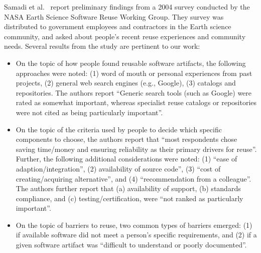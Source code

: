 \documentclass{casicswhitepaper}
\begin{document}
Samadi et al.~\cite{samadi_2004} report preliminary findings from a 2004 survey conducted by the NASA Earth Science Software Reuse Working Group. They survey was distributed to government employees and contractors in the Earth science community, and asked about people's recent reuse experiences and community needs.  Several results from the study are pertinent to our work:
\begin{itemize}

\item On the topic of how people found reusable software artifacts, the following approaches were noted: (1) word of mouth or personal experiences from past projects, (2) general web search engines (e.g., Google), (3) catalogs and repositories.  The authors report ``Generic search tools (such as Google) were rated as somewhat important, whereas specialist reuse catalogs or repositories were not cited as being particularly important''.

\item On the topic of the criteria used by people to decide which specific components to choose, the authors report that ``most respondents chose saving time/money and ensuring reliability as their primary drivers for reuse''.  Further, the following additional considerations were noted: (1) ``ease of adaption/integration'', (2) availability of source code'', (3) ``cost of creating/acquiring alternative'', and (4) ``recommendation from a colleague''.  The authors further report that (a) availability of support, (b) standards compliance, and (c) testing/certification, were ``not ranked as particularly important''.

\item On the topic of barriers to reuse, two common types of barriers emerged: (1) if available software did not meet a person's specific requirements, and (2) if a given software artifact was ``difficult to understand or poorly documented''.

\end{itemize}
\end{document}
